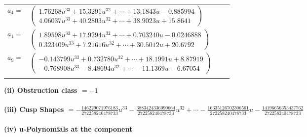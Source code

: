 \documentclass[1p]{elsarticle_modified}
\theoremstyle{definition}
\begin{document}
\begin{tabular}{m{7pt} m{180pt} m{7pt} m{180pt} }
\flushright $a_{4}=$&$\begin{pmatrix}1.76268 u^{33}+15.3291 u^{32}+\cdots+13.1843 u-0.885994\\4.06037 u^{33}+40.2803 u^{32}+\cdots+38.9023 u+15.8641\end{pmatrix}$ \\
\flushright $a_{1}=$&$\begin{pmatrix}1.89598 u^{33}+17.9294 u^{32}+\cdots+0.703240 u-0.0246888\\0.323409 u^{33}+7.21616 u^{32}+\cdots+30.5012 u+20.6792\end{pmatrix}$ \\
\flushright $a_{9}=$&$\begin{pmatrix}-0.143799 u^{33}+0.732780 u^{32}+\cdots+18.1991 u+8.87919\\-0.768908 u^{33}-8.48694 u^{32}+\cdots-11.1369 u-6.67054\end{pmatrix}$\\&\end{tabular}
\flushleft \textbf{(ii) Obstruction class $= -1$}\\~\\
\flushleft \textbf{(iii) Cusp Shapes $= -\frac{146229071976183}{272258240478733} u^{33}-\frac{3883424336090664}{272258240478733} u^{32}+\cdots-\frac{16335126702306561}{272258240478733} u-\frac{14196656353437762}{272258240478733}$}\\~\\
\newpage\renewcommand{\arraystretch}{1}
\flushleft \textbf{(iv) u-Polynomials at the component}\newline \\
\end{document}
